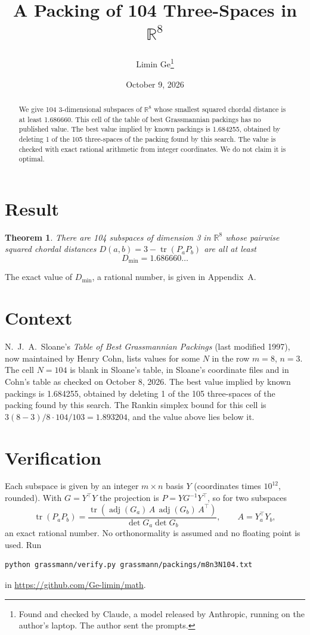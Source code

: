 \documentclass[11pt,a4paper]{article}
\title{A Packing of 104 Three-Spaces in $\mathbb{R}^{8}$}
\author{Limin Ge\thanks{Found and checked by Claude, a model released by Anthropic, running on the author's laptop. The author sent the prompts.}}
\date{October 9, 2026}
\newtheorem*{theorem}{Theorem}
\begin{document}
\maketitle
\begin{abstract}
We give 104 3-dimensional subspaces of $\mathbb{R}^{8}$ whose smallest squared chordal distance is at least 1.686660. This cell of the table of best Grassmannian packings has no published value. The best value implied by known packings is 1.684255, obtained by deleting 1 of the 105 three-spaces of the packing found by this search. The value is checked with exact rational arithmetic from integer coordinates. We do not claim it is optimal.
\end{abstract}

\section{Result}
\begin{theorem}
There are 104 subspaces of dimension 3 in $\mathbb{R}^{8}$ whose pairwise squared chordal distances $D(a,b) = 3 - \operatorname{tr}(P_aP_b)$ are all at least
\[ D_{\min} = 1.686660\ldots \]
\end{theorem}
The exact value of $D_{\min}$, a rational number, is given in Appendix~A.


\section{Context}
N.~J.~A.~Sloane's \emph{Table of Best Grassmannian Packings} (last modified 1997), now maintained by Henry Cohn, lists values for some $N$ in the row $m=8$, $n=3$. The cell $N=104$ is blank in Sloane's table, in Sloane's coordinate files and in Cohn's table as checked on October 8, 2026. The best value implied by known packings is 1.684255, obtained by deleting 1 of the 105 three-spaces of the packing found by this search. The Rankin simplex bound for this cell is $3(8-3)/8\cdot 104/103 = 1.893204$, and the value above lies below it.


\section{Verification}
Each subspace is given by an integer $m\times n$ basis $Y$ (coordinates times $10^{12}$, rounded). With $G=Y^\top Y$ the projection is $P=YG^{-1}Y^\top$, so for two subspaces
\[ \operatorname{tr}(P_aP_b)=\frac{\operatorname{tr}(\operatorname{adj}(G_a)\,A\,\operatorname{adj}(G_b)\,A^\top)}{\det G_a\det G_b},\qquad A=Y_a^\top Y_b, \]
an exact rational number. No orthonormality is assumed and no floating point is used. Run
\begin{verbatim}
python grassmann/verify.py grassmann/packings/m8n3N104.txt
\end{verbatim}
in \url{https://github.com/Ge-limin/math}.
\end{document}
